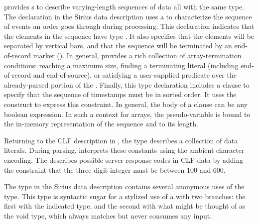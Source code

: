 \documentclass{sig-alternate}
\newcommand{\dibbler}{Sirius}
\begin{document}
\pads{} provides s to describe varying-length sequences of data all 
with the same type.  The  declaration in the \dibbler{} data description
uses a  to characterize the sequence of events an
order goes through during processing.  This declaration indicates that the elements
in the sequence have type .  It also specifies that the elements will
be separated by vertical bars, and that the sequence will be terminated by 
an end-of-record marker ().  In general, \pads{} provides a rich collection
of array-termination conditions: reaching a maximum size, finding a terminating
literal (including end-of-record and end-of-source),
or satisfying a user-supplied predicate over the already-parsed portion of 
the .  Finally, this type declaration includes a  clause
to specify that the sequence of timestamps must be in sorted order.
It uses the  construct to express this constraint.
In general, the body of a  clause can be any boolean expression.
In such a context for arrays, the pseudo-variable  is bound to the in-memory representation of the sequence and  to its length.

Returning to the CLF description in , the  type  describes
a collection of data literals.  During parsing, \pads{} interprets these
constants using the ambient character encoding.  The  
 describes possible server response codes in CLF data by adding
the constraint that the three-digit integer must be between 100 and 600.

The  type in the \dibbler{} data description contains several
anonymous uses of the  type.  This type is syntactic sugar for a 
stylized use of a  with two branches: the first with the indicated type, and the second with what might be thought of as the void type, which  
always matches but never consumes any input.

\setlength{\floatsep}{0pt}
\setlength{\dblfloatsep}{0pt}
\setcounter{totalnumber}{4}
\setcounter{dbltopnumber}{2}
\begin{figure*}[t!]
\end{figure*}
\end{document}
